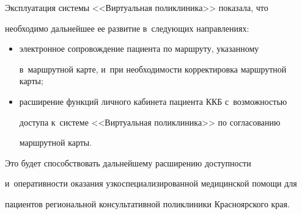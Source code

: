   


  Эксплуатация системы <<Виртуальная поликлиника>> показала, что 


необходимо дальнейшее ее развитие в~следующих направлениях: 


  \begin{itemize}


  \item электронное сопровождение пациента по маршруту, указанному 


в~маршрутной карте, и~при необходимости корректировка маршрутной карты; 


  \item расширение функций личного кабинета пациента ККБ с~возможностью 


доступа к~системе <<Виртуальная поликлиника>> по согласованию 


маршрутной карты. 


  \end{itemize}


  


  Это будет способствовать дальнейшему расширению доступности 


и~оперативности оказания узкоспециализированной медицинской помощи для 


пациентов региональной консультативной поликлиники Красноярского края. 


  


